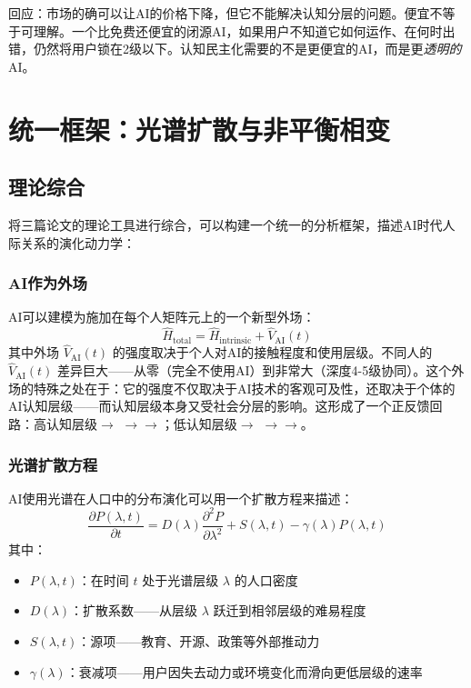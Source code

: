 \documentclass[12pt,a4paper]{ctexart}
\begin{document}
回应：市场的确可以让AI的价格下降，但它不能解决认知分层的问题。便宜不等于可理解。一个比免费还便宜的闭源AI，如果用户不知道它如何运作、在何时出错，仍然将用户锁在2级以下。认知民主化需要的不是更便宜的AI，而是更\textit{透明的}AI。

\section{统一框架：光谱扩散与非平衡相变}

\subsection{理论综合}

将三篇论文的理论工具进行综合，可以构建一个统一的分析框架，描述AI时代人际关系的演化动力学：

\subsubsection{AI作为外场}

AI可以建模为施加在每个人矩阵元上的一个新型外场：
\begin{equation}
\hat{H}_{\text{total}} = \hat{H}_{\text{intrinsic}} + \hat{V}_{\text{AI}}(t)
\end{equation}
其中外场 $\hat{V}_{\text{AI}}(t)$ 的强度取决于个人对AI的接触程度和使用层级。不同人的 $\hat{V}_{\text{AI}}(t)$ 差异巨大——从零（完全不使用AI）到非常大（深度4-5级协同）。这个外场的特殊之处在于：它的强度不仅取决于AI技术的客观可及性，还取决于个体的AI认知层级——而认知层级本身又受社会分层的影响。这形成了一个正反馈回路：高认知层级$\rightarrow$ $\rightarrow$$\rightarrow$；低认知层级$\rightarrow$ $\rightarrow$$\rightarrow$。

\subsubsection{光谱扩散方程}

AI使用光谱在人口中的分布演化可以用一个扩散方程来描述：
\begin{equation}
\frac{\partial P(\lambda, t)}{\partial t} = D(\lambda) \frac{\partial^2 P}{\partial \lambda^2} + S(\lambda, t) - \gamma(\lambda) P(\lambda, t)
\end{equation}
其中：
\begin{itemize}
\item $P(\lambda, t)$：在时间 $t$ 处于光谱层级 $\lambda$ 的人口密度
\item $D(\lambda)$：扩散系数——从层级 $\lambda$ 跃迁到相邻层级的难易程度
\item $S(\lambda, t)$：源项——教育、开源、政策等外部推动力
\item $\gamma(\lambda)$：衰减项——用户因失去动力或环境变化而滑向更低层级的速率
\end{itemize}
\end{document}
